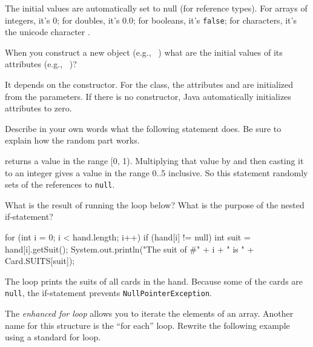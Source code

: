 \begin{answer}
The initial values are automatically set to null (for reference types). For arrays of integers, it's 0; for doubles, it's 0.0; for booleans, it's {\tt false}; for characters, it's the unicode character .
\end{answer}


\Q When you construct a new object (e.g., ~) what are the initial values of its attributes (e.g., ~)?

\begin{answer}
It depends on the constructor. For the  class, the attributes  and  are initialized from the parameters. If there is no constructor, Java automatically initializes attributes to zero.
\end{answer}


\Q Describe in your own words what the following statement does. Be sure to explain how the random part works.

\begin{center}
\end{center}

\begin{answer}
 returns a value in the range [0, 1).
Multiplying that value by  and then casting it to an integer gives a value in the range 0..5 inclusive.
So this statement randomly sets of the  references to {\tt null}.
\end{answer}


\Q \label{forcard} What is the result of running the loop below?
What is the purpose of the nested if-statement?

\begin{javalst}
for (int i = 0; i < hand.length; i++) {
    if (hand[i] != null) {
        int suit = hand[i].getSuit();
        System.out.println("The suit of #" + i + " is " + Card.SUITS[suit]);
    }
}
\end{javalst}
\vspace{-1ex}

\begin{answer}
The loop prints the suits of all cards in the hand.
Because some of the cards are {\tt null}, the if-statement prevents {\tt NullPointerException}.
\end{answer}


\Q The \textit{enhanced for loop} allows you to iterate the elements of an array.
Another name for this structure is the ``for each'' loop.
Rewrite the following example using a standard for loop.

